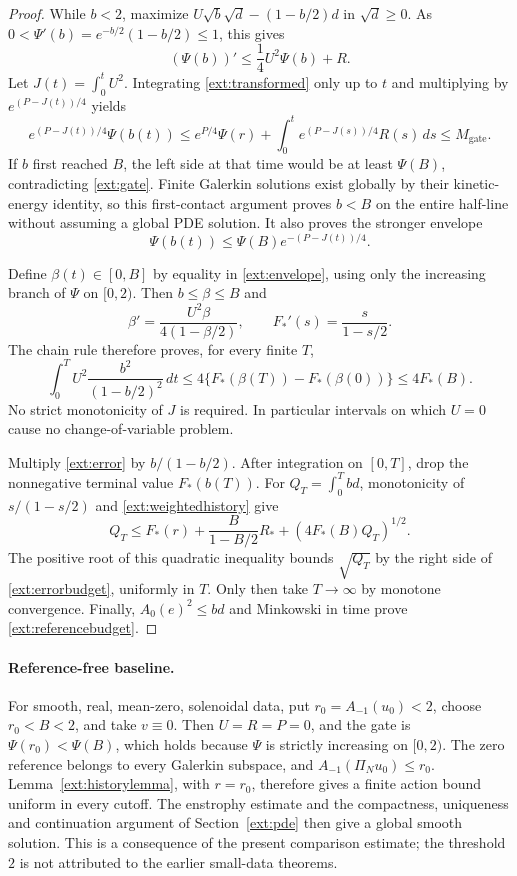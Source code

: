 \begin{proof}
While $b<2$, maximize $U\sqrt b\sqrt d-(1-b/2)d$ in $\sqrt d\ge0$.
As $0<\Psi'(b)=e^{-b/2}(1-b/2)\le1$, this gives
\begin{equation}
 (\Psi(b))'\le\frac14U^2\Psi(b)+R.
 \label{ext:transformed}
\end{equation}
Let $J(t)=\int_0^tU^2$. Integrating \eqref{ext:transformed} only up to $t$
and multiplying by $e^{(P-J(t))/4}$ yields
\[
 e^{(P-J(t))/4}\Psi(b(t))
 \le e^{P/4}\Psi(r)+
 \int_0^t e^{(P-J(s))/4}R(s)\,ds\le M_{\mathrm{gate}}.
\]
If $b$ first reached $B$, the left side at that time would be at least
$\Psi(B)$, contradicting \eqref{ext:gate}. Finite Galerkin solutions exist
globally by their kinetic-energy identity, so this first-contact argument
proves $b<B$ on the entire half-line without assuming a global PDE solution.
It also proves the stronger envelope
\begin{equation}
 \Psi(b(t))\le\Psi(B)e^{-(P-J(t))/4}.
 \label{ext:envelope}
\end{equation}

Define $\beta(t)\in[0,B]$ by equality in \eqref{ext:envelope}, using only
the increasing branch of $\Psi$ on $[0,2)$. Then $b\le\beta\le B$ and
\[
 \beta'=\frac{U^2\beta}{4(1-\beta/2)},\qquad
 F_*'(s)=\frac{s}{1-s/2}.
\]
The chain rule therefore proves, for every finite $T$,
\begin{equation}
 \int_0^T U^2\frac{b^2}{(1-b/2)^2}\,dt
 \le4\{F_*(\beta(T))-F_*(\beta(0))\}\le4F_*(B).
 \label{ext:weightedhistory}
\end{equation}
No strict monotonicity of $J$ is required. In particular intervals on which
$U=0$ cause no change-of-variable problem.

Multiply \eqref{ext:error} by $b/(1-b/2)$. After integration on $[0,T]$,
drop the nonnegative terminal value $F_*(b(T))$. For
$Q_T=\int_0^Tbd$, monotonicity of $s/(1-s/2)$ and
\eqref{ext:weightedhistory} give
\[
 Q_T\le F_*(r)+\frac{B}{1-B/2}R_*+
 \left(4F_*(B)Q_T\right)^{1/2}.
\]
The positive root of this quadratic inequality bounds $\sqrt{Q_T}$ by
the right side of \eqref{ext:errorbudget}, uniformly in $T$.
Only then take $T\to\infty$ by monotone convergence. Finally,
$A_0(e)^2\le bd$ and Minkowski in time prove
\eqref{ext:referencebudget}.
\end{proof}

\paragraph{Reference-free baseline.}
For smooth, real, mean-zero, solenoidal data, put $r_0=A_{-1}(u_0)<2$,
choose $r_0<B<2$, and take $v\equiv0$. Then $U=R=P=0$, and the gate is
$\Psi(r_0)<\Psi(B)$, which holds because $\Psi$ is strictly increasing
on $[0,2)$. The zero reference belongs to every Galerkin subspace, and
$A_{-1}(\Pi_Nu_0)\le r_0$. Lemma~\ref{ext:historylemma}, with $r=r_0$,
therefore gives a finite action bound uniform in every cutoff.
The enstrophy estimate and the compactness, uniqueness and continuation
argument of Section~\ref{ext:pde} then give a global smooth solution.
This is a consequence of the present comparison estimate; the threshold
$2$ is not attributed to the earlier small-data theorems.

